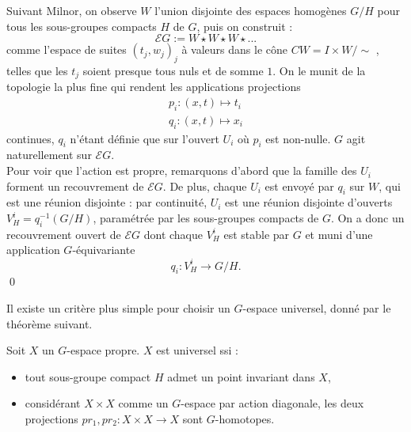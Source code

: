 \begin{dem}
Suivant Milnor, on observe $W$ l'union disjointe des espaces homogènes $G/H$ pour tous les sous-groupes compacts $H$ de $G$, puis on construit :
\[\mathcal E G := W \star W\star W\star...\]
comme l'espace de suites $(t_j,w_j)_j$ à valeurs dans le cône $CW=I\times W / \sim$ , telles que les $t_j$ soient presque tous nuls et de somme $1$. On le munit de la topologie la plus fine qui rendent les applications projections 
\[\begin{array}{l} p_i : (x,t)\mapsto t_i  \\
			q_i : (x,t)\mapsto x_i 
\end{array}\]
continues, $q_i$ n'étant définie que sur l'ouvert $U_i$ où $p_i$ est non-nulle. $G$ agit naturellement sur $\mathcal E G$.\\

Pour voir que l'action est propre, remarquons d'abord que la famille des $U_i$ forment un recouvrement de $\mathcal E G$. De plus, chaque $U_i$ est envoyé par $q_i$ sur $W$, qui est une réunion disjointe : par continuité, $U_i$ est une réunion disjointe d'ouverts $V^i_H=q_i^{-1}(G/H)$, paramétrée par les sous-groupes compacts de $G$. On a donc un recouvrement ouvert de $\mathcal E G$ dont chaque $V_H^i$ est stable par $G$ et muni d'une application $G$-équivariante 
\[q_i : V_H^i \rightarrow G/H.\]
\qed
\end{dem}
Il existe un critère plus simple pour choisir un $G$-espace universel, donné par le théorème suivant.

\begin{thm}
Soit $X$ un $G$-espace propre. $X$ est universel ssi :
\begin{itemize}
\item tout sous-groupe compact $H$ admet un point invariant dans $X$,
\item considérant $X\times X$ comme un $G$-espace par action diagonale, les deux projections $pr_1,pr_2 : X\times X\rightarrow X$ sont $G$-homotopes.
\end{itemize}
\end{thm}

